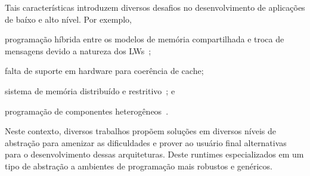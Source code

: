 	Tais características introduzem diversos desafios no desenvolvimento de
	aplicações de baíxo e alto nível. Por exemplo,
	\begin{enumerate*}[label=(\roman*)]
		\item programação híbrida entre os modelos de memória compartilhada
			e troca de mensagens devido a natureza dos LWs~\cite{kelly2013};

		\item falta de suporte em hardware para coerência de
			cache\cite{francesquini2015};

		\item sistema de memória distribuído e restritivo~\cite{Castro2016}; e

		\item programação de componentes heterogêneos~\cite{Barbalace2015}.
	\end{enumerate*}
	Neste contexto, diversos trabalhos propõem soluções em diversos níveis de
	abstração para amenizar as dificuldades e prover ao usuário final
	alternativas para o desenvolvimento dessas arquiteturas. Deste runtimes
	especializados em um tipo de abstração a ambientes de programação mais
	robustos e genéricos.

